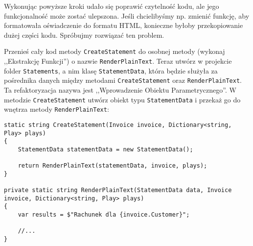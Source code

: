 Wykonując powyższe kroki udało się poprawić czytelność kodu, ale jego funkcjonalność może zostać ulepszona. Jeśli chcielibyśmy np. zmienić funkcję, aby formatowała oświadczenie do formatu HTML, konieczne byłoby przekopiowanie dużej części kodu. Spróbujmy rozwiązać ten problem.

Przenieś cały kod metody \texttt{CreateStatement} do osobnej metody (wykonaj ,,Ekstrakcję Funkcji'') o nazwie \texttt{RenderPlainText}. Teraz utwórz w projekcie folder \texttt{Statements}, a nim klasę \texttt{StatementData}, która będzie służyła za pośrednika danych między metodami \texttt{CreateStatement} oraz \texttt{RenderPlainText}. Ta refaktoryzacja nazywa jest ,,Wprowadzenie Obiektu Parametrycznego''. W metodzie \texttt{CreateStatement} utwórz obiekt typu \texttt{StatementData} i przekaż go do wnętrza metody \texttt{RenderPlainText}:
\begin{lstlisting}
static string CreateStatement(Invoice invoice, Dictionary<string, Play> plays)
{
	StatementData statementData = new StatementData();
	
	return RenderPlainText(statementData, invoice, plays);
}

private static string RenderPlainText(StatementData data, Invoice invoice, Dictionary<string, Play> plays)
{
	var results = $"Rachunek dla {invoice.Customer}";
		
	//...
}
\end{lstlisting}


